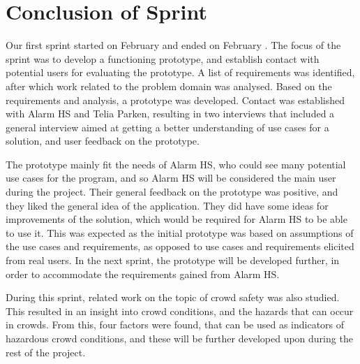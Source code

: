 \section{Conclusion of Sprint}
Our first sprint started on February  and ended on February . The focus of the sprint was to develop a functioning prototype, and establish contact with potential users for evaluating the prototype. A list of requirements was identified, after which work related to the problem domain was analysed. Based on the requirements and analysis, a prototype was developed. Contact was established with Alarm HS and Telia Parken, resulting in two interviews that included a general interview aimed at getting a better understanding of use cases for a solution, and user feedback on the prototype.

The prototype mainly fit the needs of Alarm HS, who could see many potential use cases for the program, and so Alarm HS will be considered the main user during the project. Their general feedback on the prototype was positive, and they liked the general idea of the application. They did have some ideas for improvements of the solution, which would be required for Alarm HS to be able to use it. This was expected as the initial prototype was based on assumptions of the use cases and requirements, as opposed to use cases and requirements elicited from real users. In the next sprint, the prototype will be developed further, in order to accommodate the requirements gained from Alarm HS.

During this sprint, related work on the topic of crowd safety was also studied. This resulted in an insight into crowd conditions, and the hazards that can occur in crowds. From this, four factors were found, that can be used as indicators of hazardous crowd conditions, and these will be further developed upon during the rest of the project.




